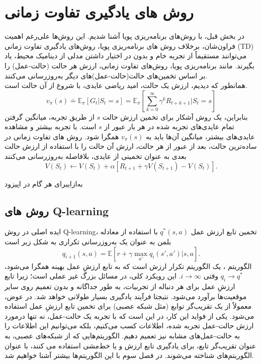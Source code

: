 \section{روش های یادگیری تفاوت زمانی}
در بخش قبل، با روش‌های برنامه‌ریزی پویا آشنا شدیم. این روش‌ها علی‌رغم اهمیت فراون‌شان،
برخلاف روش های برنامه‌ریزی پویا، روش‌های 
{یادگیری تفاوت زمانی} (TD) می‌توانند مستقیماً از تجربه خام و بدون در اختیار داشتن مدلی از دینامیک محیط، یاد بگیرند. مانند برنامه‌ریزی پویا، روش‌های تفاوت زمانی، ارزش‌ هر حالت (حالت-عمل) را بر اساس تخمین‌های حالت‌(حالت-عمل)‌های دیگر به‌روزرسانی می‌کنند.
\\همانطور که دیدیم، ارزش یک حالت، امید ریاضی عایدی، با شروع از آن حالت است.
$$v_\pi(s) \doteq \mathbb{E}_\pi\left[G_t| S_t=s\right] = \mathbb{E}_\pi\left[\sum_{k=0}^{\infty} \gamma^k R_{t+k+1}|S_t =s \right]$$
بنابراین، یک روش آشکار برای تخمین ارزش حالت $s$ از طریق تجربه، میانگین گرفتن تمام عایدی‌های تجربه شده در هر بار عبور از $s$ است.
با تجربه بیشتر و مشاهده عایدی‌های بیشتر، میانگین آن‌ها باید به $v_\pi(s)$ همگرا شود.
روش های تفاوت زمانی در ساده‌ترین حالت، بعد از عبور از هر حالت، ارزش آن حالت را با استفاده از ارزش حالت بعدی به عنوان تخمینی از عایدی، بلافاصله به‌روزرسانی می‌کنند
$$V(S_t) \longleftarrow V(S_t) + \alpha\left[R_{t+1} + \gamma V(S_{t+1}) - V(S_t)\right].$$

\‌به‌ازای{برای هر گام در اپیزود}
\subsection{روش های Q-learning}
ایده اصلی در روش 
Q-learning،
 تخمین تابع ارزش عمل  
$q^*(s,a)$ 
با استفاده از معادله بلمن به عنوان یک به‌روزرسانی تکراری به شکل زیر است
\cite{mnih2013playing}
$$q_{i+1}(s,a) = \mathbb{E}[r+ \gamma \max_{a'} q_i(s',a')|s,a].$$
الگوریتم 
،
یک الگوریتم تکرار ارزش است که به تابع ارزشِ عمل بهینه همگرا می‌شود، 
$q_i \longrightarrow q^*$
وقتی
$i \longrightarrow \infty$.
این رویکرد کلی، در مسائل بزرگ غیر عملی است؛
زیرا تابع ارزشِ عمل برای هر دنباله از تجربیات،  به طور جداگانه و بدون تعمیم روی سایر موقعیت‌ها برآورد می‌شود. نتیجتا فرآیند یادگیری بسیار طولانی خواهد شد. در عوض، معمولاً از یک تقریب‌گر توابع (مثل شبکه عصبی) برای تخمین تابع ارزشِ عمل استفاده می‌شود.  یکی از فواید این کار، در این است که با تجربه یک حالت-عمل، نه تنها درمورد ارزش حالت-عمل تجربه شده، اطلاعات کسب می‌کنیم، بلکه می‌توانیم این اطلاعات را به حالت-عمل‌های مشابه نیز تعمیم دهیم.
الگوریتم‌هایی که از شبکه‌های عصبی، به عنوان تقریب‌گر تابع، برای یادگیری تابع ارزش و یا خط‌مشی استفاده می کنند، با عنوان الگوریتم‌های 
\textit{}
شناخته می‌شوند. در فصل سوم با این الگوریتم‌ها بیشتر آشنا خواهیم شد.